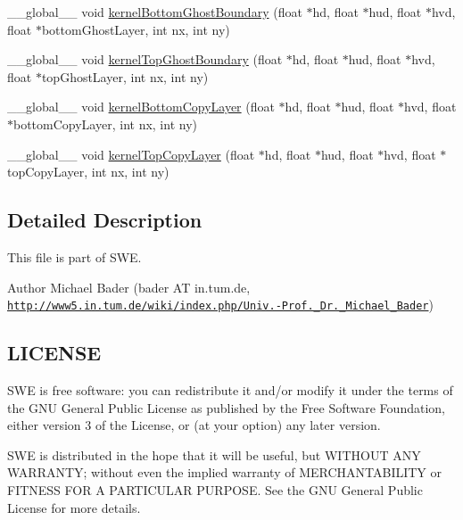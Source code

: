 \begin{DoxyCompactItemize}
\item 
\-\_\-\-\_\-global\-\_\-\-\_\- void \hyperlink{SWE__BlockCUDA__kernels_8hh_a899b7431f0cec06555bf3b0d8e848782}{kernel\-Bottom\-Ghost\-Boundary} (float $\ast$hd, float $\ast$hud, float $\ast$hvd, float $\ast$bottom\-Ghost\-Layer, int nx, int ny)
\item 
\-\_\-\-\_\-global\-\_\-\-\_\- void \hyperlink{SWE__BlockCUDA__kernels_8hh_a7cf7164d51b1b16664556c25dd675a46}{kernel\-Top\-Ghost\-Boundary} (float $\ast$hd, float $\ast$hud, float $\ast$hvd, float $\ast$top\-Ghost\-Layer, int nx, int ny)
\item 
\-\_\-\-\_\-global\-\_\-\-\_\- void \hyperlink{SWE__BlockCUDA__kernels_8hh_af1a79800b1a5fca1daaeded30541769b}{kernel\-Bottom\-Copy\-Layer} (float $\ast$hd, float $\ast$hud, float $\ast$hvd, float $\ast$bottom\-Copy\-Layer, int nx, int ny)
\item 
\-\_\-\-\_\-global\-\_\-\-\_\- void \hyperlink{SWE__BlockCUDA__kernels_8hh_a48b8d7d4d3bf3c69a289df057f4b6f3e}{kernel\-Top\-Copy\-Layer} (float $\ast$hd, float $\ast$hud, float $\ast$hvd, float $\ast$top\-Copy\-Layer, int nx, int ny)
\end{DoxyCompactItemize}


\subsection{Detailed Description}
This file is part of S\-W\-E.

\begin{DoxyAuthor}{Author}
Michael Bader (bader A\-T in.\-tum.\-de, \href{http://www5.in.tum.de/wiki/index.php/Univ.-Prof._Dr._Michael_Bader}{\tt http\-://www5.\-in.\-tum.\-de/wiki/index.\-php/\-Univ.-\/\-Prof.\-\_\-\-Dr.\-\_\-\-Michael\-\_\-\-Bader})
\end{DoxyAuthor}
\hypertarget{Writer_8hh_LICENSE}{}\subsection{L\-I\-C\-E\-N\-S\-E}\label{Writer_8hh_LICENSE}
S\-W\-E is free software\-: you can redistribute it and/or modify it under the terms of the G\-N\-U General Public License as published by the Free Software Foundation, either version 3 of the License, or (at your option) any later version.

S\-W\-E is distributed in the hope that it will be useful, but W\-I\-T\-H\-O\-U\-T A\-N\-Y W\-A\-R\-R\-A\-N\-T\-Y; without even the implied warranty of M\-E\-R\-C\-H\-A\-N\-T\-A\-B\-I\-L\-I\-T\-Y or F\-I\-T\-N\-E\-S\-S F\-O\-R A P\-A\-R\-T\-I\-C\-U\-L\-A\-R P\-U\-R\-P\-O\-S\-E. See the G\-N\-U General Public License for more details.

